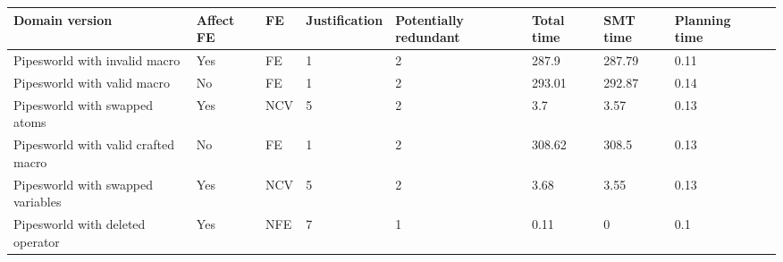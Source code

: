 \begin{table}[] 
\begin{tabular}{|l|l|l|l|l|l|l|l|l|} 
\hline 
\textbf{Domain version}  & \textbf{Affect FE} & \textbf{FE} & \textbf{Justification} &  \textbf{Potentially redundant} & \textbf{Total time}  & \textbf{SMT time}  & \textbf{Planning time}    \\ \hline 
Pipesworld with invalid macro & Yes & FE & 1 & 2 & 287.9 & 287.79 & 0.11 \\  \hline
Pipesworld with valid macro & No & FE & 1 & 2 & 293.01 & 292.87 & 0.14 \\  \hline
Pipesworld with swapped atoms & Yes & NCV & 5 & 2 & 3.7 & 3.57 & 0.13 \\  \hline
Pipesworld with valid crafted macro & No & FE & 1 & 2 & 308.62 & 308.5 & 0.13 \\  \hline
Pipesworld with swapped variables & Yes & NCV & 5 & 2 & 3.68 & 3.55 & 0.13 \\  \hline
Pipesworld with deleted operator & Yes & NFE & 7 & 1 & 0.11 & 0 & 0.1 \\  \hline
\end{tabular} 
\end{table} 
